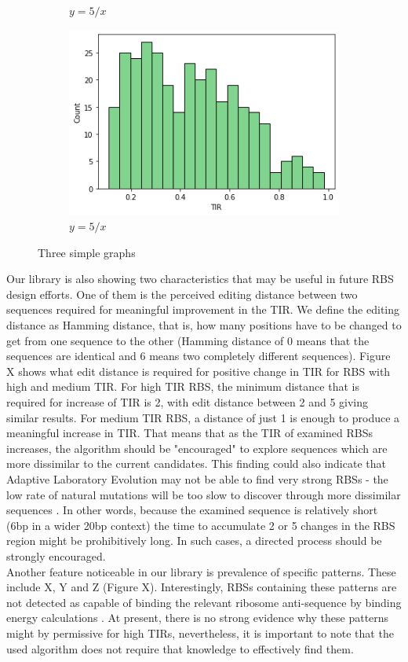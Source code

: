 \documentclass{article}
\begin{document}
\begin{figure}
\begin{subfigure}[b]{0.49\textwidth}
         \caption{$y=5/x$}
         \label{fig:five over x}
     \end{subfigure}
     \hfill
     \begin{subfigure}[b]{0.49\textwidth}
         \centering
         \includegraphics[scale=0.5]{plots/Histogram.png}
         \caption{$y=5/x$}
         \label{fig:five over x}
     \end{subfigure}
        \caption{Three simple graphs}
        \label{fig:three graphs}
\end{figure}

Our library is also showing two characteristics that may be useful in future RBS design efforts.
One of them is the perceived editing distance between two sequences required for meaningful improvement in the TIR. 
We define the editing distance as Hamming distance, that is, how many positions have to be changed to get from one sequence to the other (Hamming distance of 0 means that the sequences are identical and 6 means two completely different sequences).
Figure X shows what edit distance is required for positive change in TIR for RBS with high and medium TIR.
For high TIR RBS, the minimum distance that is required for increase of TIR is 2, with edit distance between 2 and 5 giving similar results.
For medium TIR RBS, a distance of just 1 is enough to produce a meaningful increase in TIR.
That means that as the TIR of examined RBSs increases, the algorithm should be "encouraged" to explore sequences which are more dissimilar to the current candidates.
This finding could also indicate that Adaptive Laboratory Evolution may not be able to find very strong RBSs - the low rate of natural mutations will be too slow to discover through more dissimilar sequences \cite{Lee2012}.
In other words, because the examined sequence is relatively short (6bp in a wider 20bp context) the time to accumulate 2 or 5 changes in the RBS region might be prohibitively long.
In such cases, a directed process should be strongly encouraged.\\
Another feature noticeable in our library is prevalence of specific patterns.
These include X, Y and Z (Figure X). 
Interestingly, RBSs containing these patterns are not detected as capable of binding the relevant ribosome anti-sequence by binding energy calculations \cite{Mann2017}.
At present, there is no strong evidence why these patterns might by permissive for high TIRs, nevertheless, it is important to note that the used algorithm does not require that knowledge to effectively find them.\\
\end{document}
